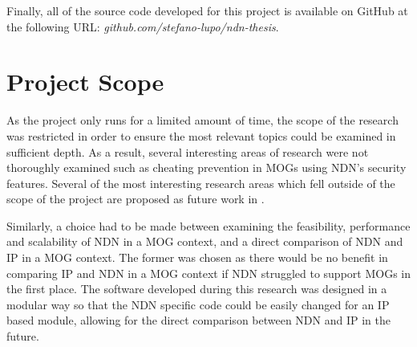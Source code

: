 Finally, all of the source code developed for this project is available on GitHub at the following URL: \textit{github.com/stefano-lupo/ndn-thesis}.


\section{Project Scope}
As the project only runs for a limited amount of time, the scope of the research was restricted in order to ensure the most relevant topics could be examined in sufficient depth. As a result, several interesting areas of research were not thoroughly examined such as cheating prevention in MOGs using NDN's security features. Several of the most interesting research areas which fell outside of the scope of the project are proposed as future work in .

Similarly, a choice had to be made between examining the feasibility, performance and scalability of NDN in a MOG context, and a direct comparison of NDN and IP in a MOG context. The former was chosen as there would be no benefit in comparing IP and NDN in a MOG context if NDN struggled to support MOGs in the first place. The software developed during this research was designed in a modular way so that the NDN specific code could be easily changed for an IP based module, allowing for the direct comparison between NDN and IP in the future.

